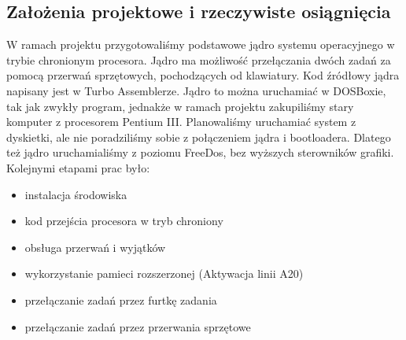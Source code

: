 \documentclass[a4paper,12pt]{article}
\begin{document}
		\subsection{Założenia projektowe i rzeczywiste osiągnięcia}
		W ramach projektu przygotowaliśmy podstawowe jądro systemu operacyjnego w trybie chronionym procesora. Jądro ma możliwość przełączania dwóch zadań za pomocą przerwań sprzętowych, pochodzących od klawiatury. Kod źródłowy jądra napisany jest w Turbo Assemblerze. Jądro to można uruchamiać w DOSBoxie, tak jak zwykły program, jednakże w ramach projektu zakupiliśmy stary komputer z procesorem Pentium III. Planowaliśmy uruchamiać system z dyskietki, ale nie poradziliśmy sobie z połączeniem jądra i bootloadera. Dlatego też jądro uruchamialiśmy z poziomu FreeDos, bez  wyższych sterowników grafiki. Kolejnymi etapami prac było:
			\begin{itemize}
				\item{instalacja środowiska}
				\item{kod przejścia procesora w tryb chroniony}
				\item{obsługa przerwań i wyjątków}
				\item{wykorzystanie pamieci rozszerzonej } (Aktywacja linii A20)
				\item{przełączanie zadań przez furtkę zadania }	
				\item{przełączanie zadań przez przerwania sprzętowe }	
			\end{itemize}
\end{document}
